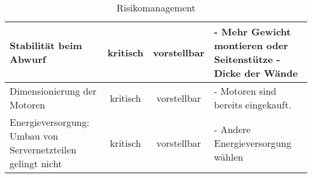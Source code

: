\begin{landscape}
\begin{table}
\begin{tabular}{|p{5cm}|c|c|p{9cm}|}
			\hline \rowcolor{yellow} \hline Stabilität beim Abwurf & kritisch & vorstellbar &
			- Mehr Gewicht montieren oder Seitenstütze \newline
			- Dicke der Wände \\ 
			
			\hline \rowcolor{yellow} \hline Dimensionierung der Motoren & kritisch & vorstellbar &
			- Motoren sind bereits eingekauft.
			\\
			
			\hline \rowcolor{yellow} \hline Energieversorgung: Umbau von Servernetzteilen gelingt nicht & kritisch & vorstellbar &
			- Andere Energieversorgung wählen \\ 
			 
		\end{tabular}
		\caption{Risikomanagement}
		\label{tab:risikomanagement}
	\end{table} 
\end{landscape}
